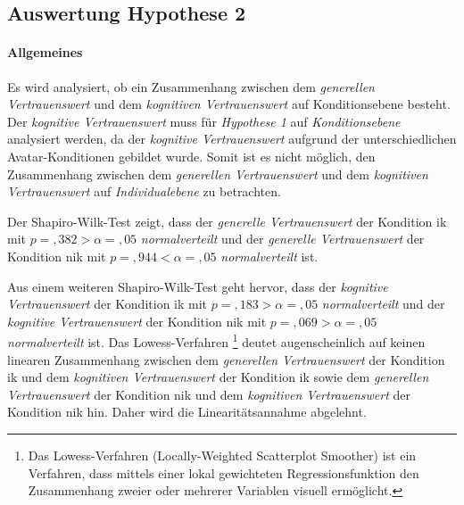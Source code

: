 \documentclass[a4paper,11pt]{article}%
\renewcommand{\\}{\vspace*{0.5\baselineskip} \newline}
\begin{document}
{\newpage
\subsection{Auswertung Hypothese 2}
\label{Auswertung Hypothese 2}

\paragraph{Allgemeines}
Es wird analysiert, ob ein Zusammenhang zwischen dem \textit{generellen Vertrauenswert} und dem \textit{kognitiven Vertrauenswert} auf Konditionsebene besteht.\\
Der \textit{kognitive Vertrauenswert} muss für \textit{Hypothese 1} auf \textit{Konditionsebene} analysiert werden, da der \textit{kognitive Vertrauenswert} aufgrund der unterschiedlichen Avatar-Konditionen gebildet wurde. Somit ist es nicht möglich, den Zusammenhang zwischen dem \textit{generellen Vertrauenswert} und dem \textit{kognitiven Vertrauenswert} auf \textit{Individualebene} zu betrachten.

Der Shapiro-Wilk-Test zeigt, dass der \textit{generelle Vertrauenswert} der Kondition \ac{ik} mit $p =,382 > \alpha =,05$ \textit{normalverteilt} und der \textit{generelle Vertrauenswert} der Kondition \newline \ac{nik} mit $p =,944 < \alpha =,05$ \textit{normalverteilt} ist.

Aus einem weiteren Shapiro-Wilk-Test geht hervor, dass der \textit{kognitive Vertrauenswert} der Kondition \ac{ik} mit  $p =,183 > \alpha = ,05$ \textit{normalverteilt} und der \textit{kognitive Vertrauenswert} der Kondition \ac{nik} mit $p =,069 > \alpha =,05$ \textit{normalverteilt} ist.
Das Lowess-Verfahren \footnote{Das Lowess-Verfahren (Locally-Weighted Scatterplot Smoother) ist ein Verfahren, dass mittels einer lokal gewichteten Regressionsfunktion den Zusammenhang zweier oder mehrerer Variablen visuell ermöglicht.} deutet augenscheinlich auf keinen linearen Zusammenhang zwischen dem \textit{generellen Vertrauenswert} der Kondition \ac{ik} und dem \textit{kognitiven Vertrauenswert} der Kondition \ac{ik} sowie dem \textit{generellen Vertrauenswert} der Kondition \ac{nik} und dem \textit{kognitiven Vertrauenswert} der Kondition \ac{nik} hin. Daher wird die Linearitätsannahme abgelehnt.

}
\end{document}
